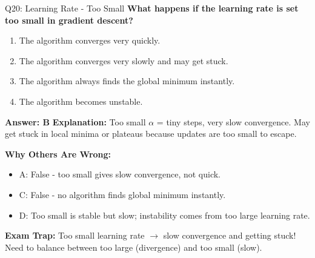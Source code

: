 \documentclass[8pt]{beamer}
\begin{document}
	\begin{frame}{Q20: Learning Rate - Too Small}
		\fontsize{6.5}{7.5}\selectfont
		\textbf{What happens if the learning rate is set too small in gradient descent?}
		
		\begin{enumerate}
			\item The algorithm converges very quickly.
			\item The algorithm converges very slowly and may get stuck.
			\item The algorithm always finds the global minimum instantly.
			\item The algorithm becomes unstable.
		\end{enumerate}
		
		\vspace{0.05cm}
		\textcolor{myblue}{\textbf{Answer: B}}
		\vspace{0.05cm}
		\textcolor{myblue}{\textbf{Explanation:}} Too small $\alpha$ = tiny steps, very slow convergence. May get stuck in local minima or plateaus because updates are too small to escape.
		
		\vspace{0.05cm}
		\textcolor{myred}{\textbf{Why Others Are Wrong:}}
		\begin{itemize}
			\item \textcolor{myred}{A:} False - too small gives slow convergence, not quick.
			\item \textcolor{myred}{C:} False - no algorithm finds global minimum instantly.
			\item \textcolor{myred}{D:} Too small is stable but slow; instability comes from too large learning rate.
		\end{itemize}
		
		\textcolor{myred}{\textbf{Exam Trap:}} Too small learning rate $\rightarrow$ \textcolor{myred}{slow convergence and getting stuck}! Need to balance between too large (divergence) and too small (slow).
	\end{frame}
	
\end{document}

